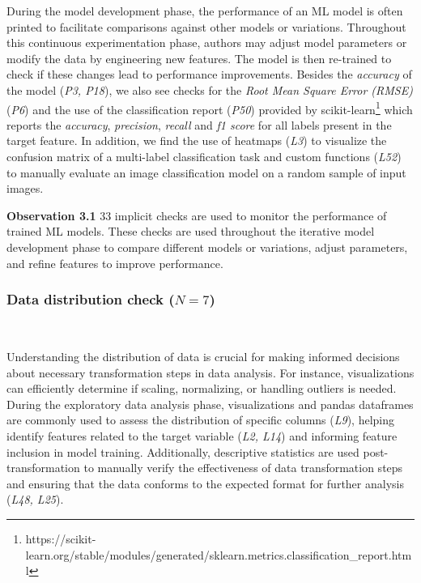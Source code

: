 \documentclass[smallextended]{svjour3}       %
\newcommand{\highlight}[1]{\begin{framed}%
  \noindent#1
\end{framed}}
\providecommand{\DIFaddbegin}{} %
\providecommand{\DIFaddend}{} %
\providecommand{\DIFdelbegin}{} %
\providecommand{\DIFdelend}{} %
\newcommand{\DIFscaledelfig}{0.5}
\newlength{\DIFdelgraphicswidth} %
\newlength{\DIFdelgraphicsheight} %
\newcommand{\DIFaddincludegraphics}[2][]{{\color{blue}\fbox{\DIFOincludegraphics[#1]{#2}}}} %
\newcommand{\DIFdelincludegraphics}[2][]{%
\sbox{\DIFdelgraphicsbox}{\DIFOincludegraphics[#1]{#2}}%
\settoboxwidth{\DIFdelgraphicswidth}{\DIFdelgraphicsbox} %
\settoboxtotalheight{\DIFdelgraphicsheight}{\DIFdelgraphicsbox} %
\scalebox{\DIFscaledelfig}{%
\parbox[b]{\DIFdelgraphicswidth}{\usebox{\DIFdelgraphicsbox}\\[-\baselineskip] \rule{\DIFdelgraphicswidth}{0em}}\llap{\resizebox{\DIFdelgraphicswidth}{\DIFdelgraphicsheight}{%
\setlength{\unitlength}{\DIFdelgraphicswidth}%
\begin{picture}(1,1)%
\thicklines\linethickness{2pt} %
{\color[rgb]{1,0,0}\put(0,0){\framebox(1,1){}}}%
{\color[rgb]{1,0,0}\put(0,0){\line( 1,1){1}}}%
{\color[rgb]{1,0,0}\put(0,1){\line(1,-1){1}}}%
\end{picture}%
}\hspace*{3pt}}} %
} %
\DeclareRobustCommand{\DIFaddbegin}{\DIFOaddbegin \let\includegraphics\DIFaddincludegraphics} %
\DeclareRobustCommand{\DIFaddend}{\DIFOaddend \let\includegraphics\DIFOincludegraphics} %
\DeclareRobustCommand{\DIFdelbegin}{\DIFOdelbegin \let\includegraphics\DIFdelincludegraphics} %
\DeclareRobustCommand{\DIFdelend}{\DIFOaddend \let\includegraphics\DIFOincludegraphics} %
\begin{document}
During the model development phase, the performance of an ML model is often printed to facilitate comparisons against other models or variations. Throughout this continuous experimentation phase, authors may adjust model parameters or modify the data by engineering new features. The model is then re-trained to check if these changes lead to performance improvements. Besides the \emph{accuracy} of the model (\emph{P3, P18}), we also see checks for the \emph{Root Mean Square Error (RMSE)} (\emph{P6}) and the use of the classification report (\emph{P50}) provided by scikit-learn\footnote{https://scikit-learn.org/stable/modules/generated/sklearn.metrics.classification\_report.html} which reports the \emph{accuracy}, \emph{precision}, \emph{recall} and \emph{f1 score} for all labels present in the target feature. In addition, we find the use of heatmaps (\emph{L3}) to visualize the confusion matrix of a multi-label classification task and custom functions (\emph{L52}) to manually evaluate an image classification model on a random sample of input images.

\DIFdelbegin %
\DIFdelend \DIFaddbegin \highlight{\textbf{Observation 3.1} 33 implicit checks are used to monitor the performance of trained ML models. These checks are used throughout the iterative model development phase to compare different models or variations, adjust parameters, and refine features to improve performance.}
\DIFaddend 

\subsubsection{Data distribution check ($N = 7$)}~\label{sec:data-distribution-output}

Understanding the distribution of data is crucial for making informed decisions about necessary transformation steps in data analysis. For instance, visualizations can efficiently determine if scaling, normalizing, or handling outliers is needed. During the exploratory data analysis phase, visualizations and pandas dataframes are commonly used to assess the distribution of specific columns (\emph{L9}), helping identify features related to the target variable (\emph{L2, L14}) and informing feature inclusion in model training. Additionally, descriptive statistics are used post-transformation to manually verify the effectiveness of data transformation steps and ensuring that the data conforms to the expected format for further analysis (\emph{L48, L25}).
\end{document}
